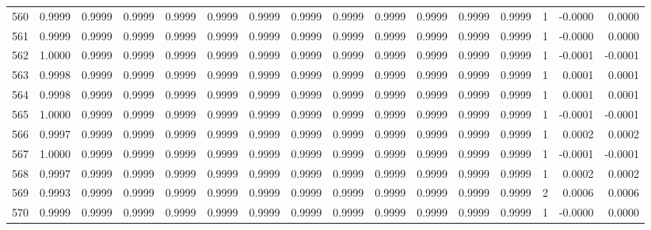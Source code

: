 \begin{tabular}{lrrrrrrrrrrrrrrr}
560 &      0.9999 &  0.9999 &  0.9999 &  0.9999 &  0.9999 &  0.9999 &  0.9999 &  0.9999 &  0.9999 &  0.9999 &   0.9999 &     0.9999 &      1 &                   -0.0000 &                     0.0000 \\
561 &      0.9999 &  0.9999 &  0.9999 &  0.9999 &  0.9999 &  0.9999 &  0.9999 &  0.9999 &  0.9999 &  0.9999 &   0.9999 &     0.9999 &      1 &                   -0.0000 &                     0.0000 \\
562 &      1.0000 &  0.9999 &  0.9999 &  0.9999 &  0.9999 &  0.9999 &  0.9999 &  0.9999 &  0.9999 &  0.9999 &   0.9999 &     0.9999 &      1 &                   -0.0001 &                    -0.0001 \\
563 &      0.9998 &  0.9999 &  0.9999 &  0.9999 &  0.9999 &  0.9999 &  0.9999 &  0.9999 &  0.9999 &  0.9999 &   0.9999 &     0.9999 &      1 &                    0.0001 &                     0.0001 \\
564 &      0.9998 &  0.9999 &  0.9999 &  0.9999 &  0.9999 &  0.9999 &  0.9999 &  0.9999 &  0.9999 &  0.9999 &   0.9999 &     0.9999 &      1 &                    0.0001 &                     0.0001 \\
565 &      1.0000 &  0.9999 &  0.9999 &  0.9999 &  0.9999 &  0.9999 &  0.9999 &  0.9999 &  0.9999 &  0.9999 &   0.9999 &     0.9999 &      1 &                   -0.0001 &                    -0.0001 \\
566 &      0.9997 &  0.9999 &  0.9999 &  0.9999 &  0.9999 &  0.9999 &  0.9999 &  0.9999 &  0.9999 &  0.9999 &   0.9999 &     0.9999 &      1 &                    0.0002 &                     0.0002 \\
567 &      1.0000 &  0.9999 &  0.9999 &  0.9999 &  0.9999 &  0.9999 &  0.9999 &  0.9999 &  0.9999 &  0.9999 &   0.9999 &     0.9999 &      1 &                   -0.0001 &                    -0.0001 \\
568 &      0.9997 &  0.9999 &  0.9999 &  0.9999 &  0.9999 &  0.9999 &  0.9999 &  0.9999 &  0.9999 &  0.9999 &   0.9999 &     0.9999 &      1 &                    0.0002 &                     0.0002 \\
569 &      0.9993 &  0.9999 &  0.9999 &  0.9999 &  0.9999 &  0.9999 &  0.9999 &  0.9999 &  0.9999 &  0.9999 &   0.9999 &     0.9999 &      2 &                    0.0006 &                     0.0006 \\
570 &      0.9999 &  0.9999 &  0.9999 &  0.9999 &  0.9999 &  0.9999 &  0.9999 &  0.9999 &  0.9999 &  0.9999 &   0.9999 &     0.9999 &      1 &                   -0.0000 &                     0.0000 \\

\end{tabular}
